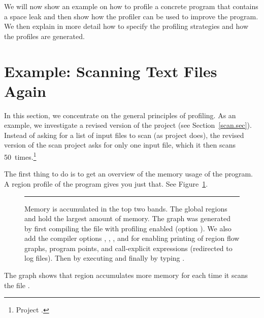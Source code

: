\documentclass[12pt]{book}
\begin{document}
We will now show an example on how to profile a concrete program that contains a
space leak and then show how the profiler can be used to improve the program. We
then explain in more detail how to specify the profiling strategies and how the
profiles are generated.

\section{Example: Scanning Text Files Again}

In this section, we concentrate on the general principles of profiling. As an
example, we investigate a revised version of the project 
(see Section~\ref{scan.sec}). Instead of asking for a list of input files to
scan (as project  does), the revised version of the scan project
asks for only one input file, which it then scans
%
%
%
50~times.\footnote{Project .}

The first thing to do is to get an overview of the memory usage of the
program. A region profile of the program gives you just that. See
Figure~\ref{scan_rev1.fig}.
\begin{figure}
\caption{Memory is accumulated in the top two bands. The global regions 
  and  hold the largest amount of memory. The graph was generated by
  first compiling the  file with profiling enabled
  (option ). We also add the compiler options ,
  , , and  for enabling printing of region flow
  graphs, program points, and call-explicit expressions (redirected to log
  files). Then by executing
  and finally by typing .}
\label{scan_rev1.fig}
\medskip\hrule
\end{figure}

The graph shows that region  accumulates more memory for each time
it scans the file .
\end{document}
